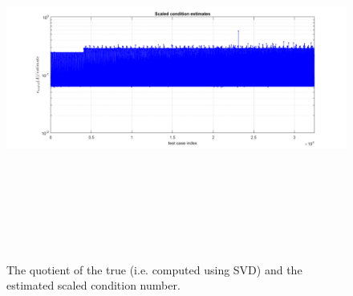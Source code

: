 \documentclass[12pt, a4paper, final]{article}
\numberwithin{equation}{section}
\begin{document}
\begin{figure}[h]
	\begin{center}
		\includegraphics[width=6.3in,height=4.7in]{Fig8.png}
	\end{center}	
	\caption{ \label{fig:8} The quotient of the true (i.e. computed using SVD) and the estimated scaled condition number. }
\end{figure}


\end{document}
